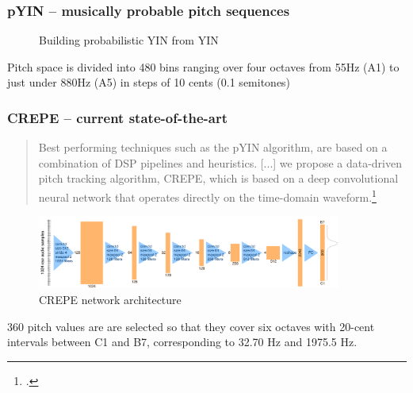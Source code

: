 \documentclass{beamer}
\begin{document}
\begin{frame}
	\frametitle{pYIN -- musically probable pitch sequences}
	\begin{figure}
		\hspace{0.1em}
		\caption{Building probabilistic YIN from YIN}
		\vspace{-1.5em}
	\end{figure}
	Pitch space is divided into 480 bins ranging over four octaves from 55Hz (A1) to just under 880Hz (A5) in steps of 10 cents (0.1 semitones)
\end{frame}


\begin{frame}
	\frametitle{CREPE -- current state-of-the-art}
	\begin{quote}
		Best performing techniques such as the pYIN algorithm, are based on a combination of DSP pipelines and heuristics. [...] we propose a data-driven pitch tracking algorithm, CREPE, which is based on a deep convolutional neural network that operates directly on the time-domain waveform.\footcite{crepe}
	\end{quote}
	\begin{figure}
		\includegraphics[width=10cm]{./crepe_arch.png}
		\caption{CREPE network architecture}
		\vspace{-1em}
	\end{figure}
	360 pitch values are are selected so that they cover six octaves with 20-cent intervals between C1 and B7, corresponding to 32.70 Hz and 1975.5 Hz.
\end{frame}
\end{document}
